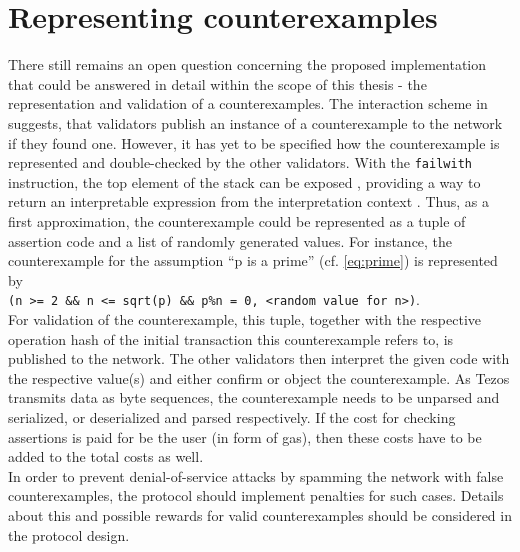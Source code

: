 \section{Representing counterexamples}
There still remains an open question concerning the proposed implementation that could be answered in detail within the scope of this thesis - the representation and validation of a counterexamples. The interaction scheme in  suggests, that validators publish an instance of a counterexample to the network if they found one. However, it has yet to be specified how the counterexample is represented and double-checked by the other validators. With the \texttt{failwith} instruction, the top element of the stack can be exposed \cite{tezos_docs}, providing a way to return an interpretable expression from the interpretation context \cite{tezos_repo}. Thus, as a first approximation, the counterexample could be represented as a tuple of assertion code and a list of randomly generated values. For instance, the counterexample for the assumption ``p is a prime'' (cf. \eqref{eq:prime}) is represented by \\
\texttt{(n >= 2 \&\& n <= sqrt(p) \&\& p\%n = 0, <random value for n>)}. \\
For validation of the counterexample, this tuple, together with the respective operation hash of the initial transaction this counterexample refers to, is published to the network. The other validators then interpret the given code with the respective value(s) and either confirm or object the counterexample. As Tezos transmits data as byte sequences, the counterexample needs to be unparsed and serialized, or deserialized and parsed respectively. If the cost for checking assertions is paid for be the user (in form of gas), then these costs have to be added to the total costs as well.\\
In order to prevent denial-of-service attacks by spamming the network with false counterexamples, the protocol should implement penalties for such cases. Details about this and possible rewards for valid counterexamples should be considered in the protocol design.



